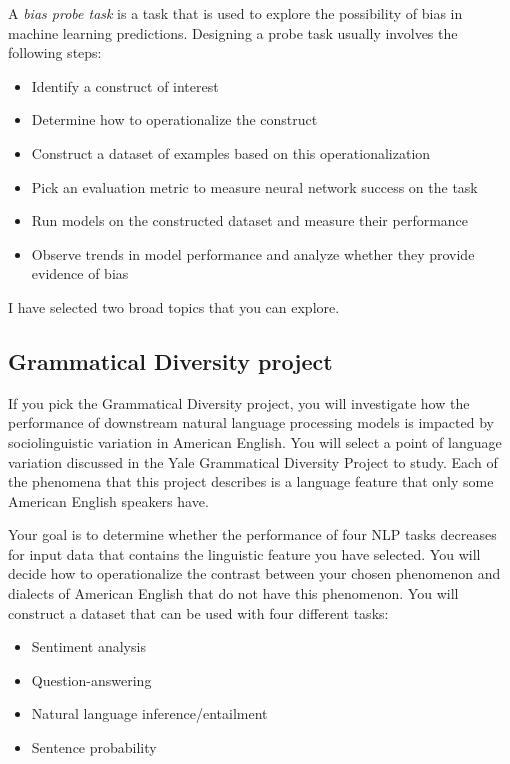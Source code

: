 \documentclass[12pt,table]{article}
\begin{document}
A \textit{bias probe task} is a task that is used to explore the possibility of bias in machine learning predictions. Designing a probe task usually involves the following steps:

\begin{itemize}
\item Identify a construct of interest
\item Determine how to operationalize the construct
\item Construct a dataset of examples based on this operationalization
\item Pick an evaluation metric to measure neural network success on the task
\item Run models on the constructed dataset and measure their performance
\item Observe trends in model performance and analyze whether they provide evidence of bias
\end{itemize}

I have selected two broad topics that you can explore. 

\subsection{Grammatical Diversity project}

If you pick the Grammatical Diversity project, you will investigate how the performance of downstream natural language processing models is impacted by sociolinguistic variation in American English. You will select a point of language variation discussed in the Yale Grammatical Diversity Project to study. Each of the phenomena that this project describes is a language feature that only some American English speakers have. 

Your goal is to determine whether the performance of four NLP tasks decreases for input data that contains the linguistic feature you have selected. You will decide how to operationalize the contrast between your chosen phenomenon and dialects of American English that do not have this phenomenon. You will construct a dataset that can be used with four different tasks:

\begin{itemize}
\item Sentiment analysis
\item Question-answering
\item  Natural language inference/entailment
\item Sentence probability
\end{itemize}
\end{document}

